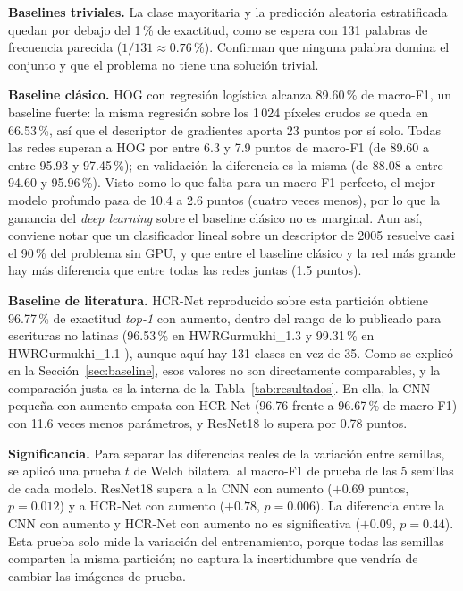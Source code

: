 \documentclass[conference]{IEEEtran}
\begin{document}
\textbf{Baselines triviales.} La clase mayoritaria y la predicción
aleatoria estratificada quedan por debajo del 1\,\% de exactitud, como se
espera con 131 palabras de frecuencia parecida ($1/131 \approx 0.76\,\%$).
Confirman que ninguna palabra domina el conjunto y que el problema no tiene
una solución trivial.

\textbf{Baseline clásico.} HOG con regresión logística alcanza 89.60\,\% de
macro-F1, un baseline fuerte: la misma regresión sobre los 1\,024 píxeles
crudos se queda en 66.53\,\%, así que el descriptor de gradientes aporta 23
puntos por sí solo. Todas las redes superan a HOG por entre 6.3 y 7.9 puntos
de macro-F1 (de 89.60 a entre 95.93 y 97.45\,\%); en validación la diferencia
es la misma (de 88.08 a entre 94.60 y 95.96\,\%). Visto como lo que falta
para un macro-F1 perfecto, el mejor modelo profundo pasa de 10.4 a 2.6 puntos
(cuatro veces menos), por lo
que la ganancia del \textit{deep learning} sobre el baseline clásico no es
marginal. Aun así, conviene notar que un clasificador lineal sobre un
descriptor de 2005 resuelve casi el 90\,\% del problema sin GPU, y que entre
el baseline clásico y la red más grande hay más diferencia que entre todas
las redes juntas (1.5 puntos).

\textbf{Baseline de literatura.} HCR-Net reproducido sobre esta partición
obtiene 96.77\,\% de exactitud \textit{top-1} con aumento, dentro del rango
de lo publicado para escrituras no latinas (96.53\,\% en HWRGurmukhi\_1.3 y
99.31\,\% en HWRGurmukhi\_1.1 \cite{hcrnet_2024}), aunque aquí hay 131
clases en vez de 35. Como se explicó en la Sección~\ref{sec:baseline}, esos
valores no son directamente comparables, y la comparación justa es la interna
de la Tabla~\ref{tab:resultados}. En ella, la CNN pequeña con aumento empata
con HCR-Net (96.76 frente a 96.67\,\% de macro-F1) con 11.6 veces menos
parámetros, y ResNet18 lo supera por 0.78 puntos.

\textbf{Significancia.} Para separar las diferencias reales de la variación
entre semillas, se aplicó una prueba $t$ de Welch bilateral al macro-F1 de
prueba de las 5 semillas de cada modelo. ResNet18 supera a la CNN con aumento
($+0.69$ puntos, $p = 0.012$) y a HCR-Net con aumento ($+0.78$, $p = 0.006$).
La diferencia entre la CNN con aumento y HCR-Net con aumento no es
significativa ($+0.09$, $p = 0.44$). Esta prueba solo mide la variación del
entrenamiento, porque todas las semillas comparten la misma partición; no
captura la incertidumbre que vendría de cambiar las imágenes de prueba.
\end{document}
